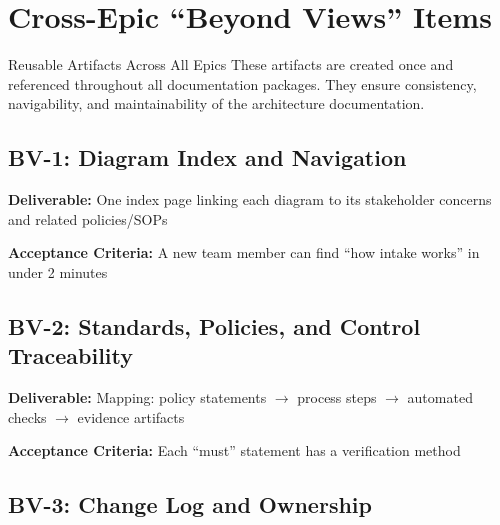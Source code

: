 \documentclass[11pt,letterpaper]{article}
\newcommand{\storyfield}[2]{\textbf{#1:} #2}
\begin{document}
\newpage

\section{Cross-Epic ``Beyond Views'' Items}

\begin{epicbox}{Reusable Artifacts Across All Epics}
These artifacts are created once and referenced throughout all documentation packages. They ensure consistency, navigability, and maintainability of the architecture documentation.
\end{epicbox}

\subsection{BV-1: Diagram Index and Navigation}

\begin{storycard}
\storyfield{Deliverable}{One index page linking each diagram to its stakeholder concerns and related policies/SOPs}

\storyfield{Acceptance Criteria}{A new team member can find ``how intake works'' in under 2 minutes}
\end{storycard}

\subsection{BV-2: Standards, Policies, and Control Traceability}

\begin{storycard}
\storyfield{Deliverable}{Mapping: policy statements $\rightarrow$ process steps $\rightarrow$ automated checks $\rightarrow$ evidence artifacts}

\storyfield{Acceptance Criteria}{Each ``must'' statement has a verification method}
\end{storycard}

\subsection{BV-3: Change Log and Ownership}
\end{document}

